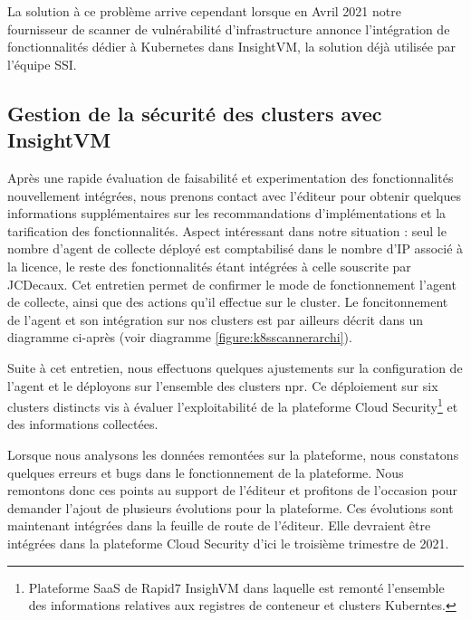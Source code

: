La solution à ce problème arrive cependant lorsque en Avril 2021 notre fournisseur de scanner de vulnérabilité 
d'infrastructure annonce l'intégration de fonctionnalités dédier à Kubernetes dans InsightVM, la solution déjà utilisée 
par l'équipe \ac{SSI}.

\subsection{Gestion de la sécurité des clusters avec InsightVM}
Après une rapide évaluation de faisabilité et experimentation des fonctionnalités nouvellement intégrées, nous prenons 
contact avec l'éditeur pour obtenir quelques informations supplémentaires sur les recommandations d'implémentations et 
la tarification des fonctionnalités. Aspect intéressant dans notre situation : seul le nombre d'agent de collecte déployé
est comptabilisé dans le nombre d'IP associé à la licence, le reste des fonctionnalités étant intégrées à celle souscrite
par JCDecaux.
\linebreak Cet entretien permet de confirmer le mode de fonctionnement l'agent de collecte, ainsi que des actions qu'il 
effectue sur le cluster. Le foncitonnement de l'agent et son intégration sur nos clusters est par ailleurs décrit dans 
un diagramme ci-après (voir diagramme \ref{figure:k8sscannerarchi}).

Suite à cet entretien, nous effectuons quelques ajustements sur la configuration de l'agent et le déployons
sur l'ensemble des clusters \ac{npr}. Ce déploiement sur six clusters distincts vis à évaluer l'exploitabilité de la 
plateforme Cloud Security\footnote{Plateforme SaaS de Rapid7 InsighVM dans laquelle est remonté l'ensemble des 
informations relatives aux registres de conteneur et clusters Kuberntes.} et des informations collectées. 

Lorsque nous analysons les données remontées sur la plateforme, nous constatons quelques erreurs et bugs dans le 
fonctionnement de la plateforme. Nous remontons donc ces points au support de l'éditeur et profitons de l'occasion
pour demander l'ajout de plusieurs évolutions pour la plateforme.
\newline Ces évolutions sont maintenant intégrées dans la feuille de route de l'éditeur. Elle devraient être intégrées 
dans la plateforme Cloud Security d'ici le troisième trimestre de 2021.

